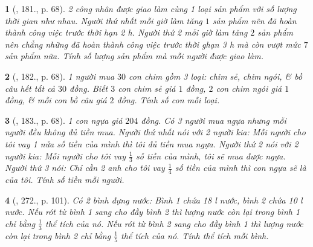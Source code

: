 \documentclass{article}
\newtheorem{baitoan}{}
\begin{document}
\begin{baitoan}[\cite{Tuyen_Toan_9_old}, 181., p. 68]
	2 công nhân được giao làm cùng 1 loại sản phẩm với số lượng thời gian như nhau. Người thứ nhất mỗi giờ làm tăng $1$ sản phẩm nên đã hoàn thành công việc trước thời hạn {\rm2 h}. Người thứ 2 mỗi giờ làm tăng $2$ sản phẩm nên chẳng những đã hoàn thành công việc trước thời ghạn {\rm3 h} mà còn vượt mức $7$ sản phẩm nữa. Tính số lượng sản phẩm mà mỗi người được giao làm.
\end{baitoan}

\begin{baitoan}[\cite{Tuyen_Toan_9_old}, 182., p. 68]
	1 người mua $30$ con chim gồm 3 loại: chim sẻ, chim ngói, \& bồ câu hết tất cả $30$ đồng. Biết $3$ con chim sẻ giá $1$ đồng, $2$ con chim ngói giá $1$ đồng, \& mỗi con bồ câu giá $2$ đồng. Tính số con mỗi loại.
\end{baitoan}

\begin{baitoan}[\cite{Tuyen_Toan_9_old}, 183., p. 68]
	1 con ngựa giá $204$ đồng. Có 3 người mua ngựa nhưng mỗi người đều không đủ tiền mua. Người thứ nhất nói với 2 người kia: Mỗi người cho tôi vay 1 nửa số tiền của mình thì tôi đủ tiền mua ngựa. Người thứ 2 nói với 2 người kia: Mỗi người cho tôi vay $\frac{1}{3}$ số tiền của mình, tôi sẽ mua được ngựa. Người thứ 3 nói: Chỉ cần 2 anh cho tôi vay $\frac{1}{4}$ số tiền của mình thì con ngựa sẽ là của tôi. Tính số tiền mỗi người.
\end{baitoan}

\begin{baitoan}[\cite{Tuyen_Toan_9_old}, 272., p. 101]
	Có 2 bình đựng nước: Bình 1 chứa {\rm18 l} nước, bình 2 chứa {\rm10 l} nước. Nếu rót từ bình 1 sang cho đầy bình 2 thì lượng nước còn lại trong bình 1 chỉ bằng $\frac{1}{3}$ thể tích của nó. Nếu rót từ bình 2 sang cho đầy bình 1 thì lượng nước còn lại trong bình 2 chỉ bằng $\frac{1}{5}$ thể tích của nó. Tính thể tích mỗi bình.
\end{baitoan}


\printbibliography[heading=bibintoc]
	
\end{document}
